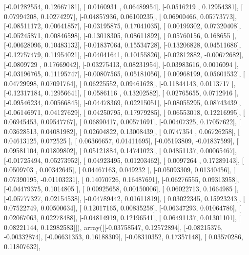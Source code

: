 \documentclass{article}
\begin{document}
       [-0.01282554,  0.12667181],
       [ 0.0160931 ,  0.06489954],
       [-0.0516219 ,  0.12954381],
       [ 0.07994208,  0.10274297],
       [-0.04857936,  0.06100235],
       [ 0.06900466,  0.05773773],
       [-0.08511172,  0.00641857],
       [-0.03195875,  0.17041035],
       [ 0.00199302,  0.07320408],
       [-0.05245871,  0.00846598],
       [-0.13018305,  0.08611892],
       [ 0.05760156,  0.168655  ],
       [-0.00628096,  0.10483132],
       [-0.01837064,  0.15534728],
       [-0.13206828,  0.04511686],
       [-0.12757479,  0.11954021],
       [-0.04041641,  0.10155826],
       [-0.02812882, -0.00672682],
       [-0.0809729 ,  0.17669042],
       [-0.03275413,  0.08231954],
       [-0.03983616,  0.0016094 ],
       [-0.03196765,  0.11195747],
       [-0.00807565,  0.05181056],
       [ 0.00968199,  0.05601532],
       [ 0.04729998,  0.07091764],
       [ 0.06225552,  0.09461628],
       [-0.11844143,  0.0113717 ],
       [-0.12317184,  0.12956641],
       [ 0.0586116 ,  0.13202582],
       [ 0.02765655,  0.0712916 ],
       [-0.09546234,  0.00566845],
       [-0.04478369,  0.02215051],
       [-0.08055295,  0.08743439],
       [-0.06146971,  0.04127629],
       [ 0.04250795,  0.17979285],
       [ 0.06553018,  0.12216995],
       [ 0.06945453,  0.09547767],
       [ 0.06890417,  0.00571691],
       [-0.00407325,  0.17057622],
       [ 0.03628513,  0.04081982],
       [ 0.02604822,  0.13008439],
       [ 0.0747354 ,  0.06726258],
       [ 0.04613125,  0.072525  ],
       [ 0.06366657,  0.01411695],
       [-0.05193809, -0.01837599],
       [ 0.09581104,  0.01809802],
       [ 0.05121884,  0.14741023],
       [ 0.04851137,  0.00065467],
       [-0.01725494,  0.05273952],
       [ 0.04923495,  0.01203462],
       [ 0.0097264 ,  0.17289143],
       [ 0.0509703 ,  0.00342645],
       [ 0.04467163,  0.049232  ],
       [-0.05093309,  0.01340456],
       [ 0.07390195, -0.01103231],
       [ 0.14070726,  0.16487691],
       [-0.06276555,  0.09313958],
       [-0.04479375,  0.1014805 ],
       [ 0.00925658,  0.00150006],
       [ 0.06022713,  0.1664985 ],
       [-0.05777327,  0.02154538],
       [-0.04789442,  0.01611819],
       [ 0.03022345,  0.15923243],
       [ 0.07522749,  0.00500634],
       [ 0.12017165,  0.00835258],
       [-0.06347293,  0.01064786],
       [ 0.02067063,  0.02278488],
       [-0.04814919,  0.12196541],
       [ 0.06491137,  0.01301101],
       [ 0.08221144,  0.12982583]]), array([[-0.03758547,  0.12572894],
       [-0.08215376, -0.00332874],
       [-0.06631353,  0.16188309],
       [-0.08310352,  0.17357148],
       [ 0.03570286,  0.11807632],
\end{document}
